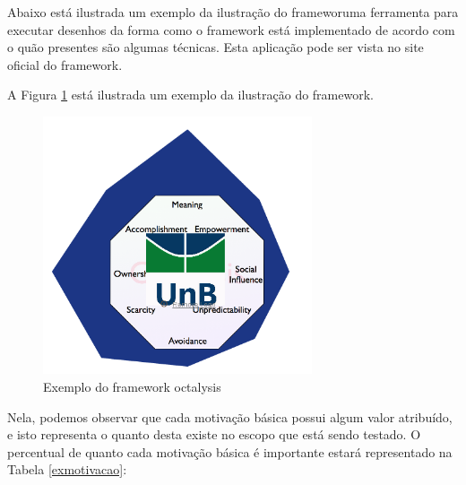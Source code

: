 Abaixo está ilustrada um exemplo da ilustração do frameworuma ferramenta para executar desenhos da forma como o framework está implementado
de acordo com o quão presentes são algumas técnicas. Esta aplicação pode ser vista no site oficial do framework.

A Figura \ref{fig:exoctalysis} está ilustrada um exemplo da ilustração do framework.

 \begin{figure}[h]
     \centering

     \includegraphics[width=300px, scale=1]{figuras/exoctalysis}
     \caption{Exemplo do framework octalysis}

     \label{fig:exoctalysis}
 \end{figure}


Nela, podemos observar que cada motivação básica possui algum valor atribuído, e isto representa o quanto desta existe no escopo que
está sendo testado. O percentual de quanto cada motivação básica é importante estará representado na Tabela \ref{exmotivacao}:

